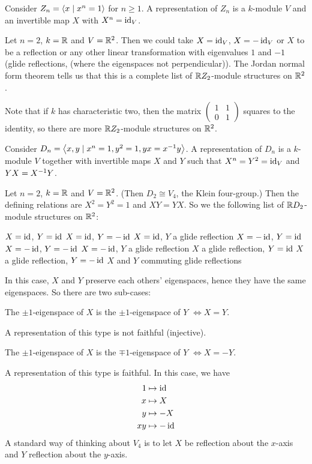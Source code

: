 \begin{exam}
	\leavevmode
	\begin{enum}
		\io
		Consider $Z_n = {\left\langle x \mid x^n=1 \right\rangle}$ for $n \geq 1$.
		A representation of $Z_n$ is a $k$-module $V$ and an invertible map $X$ with $X^n=\operatorname{id}_V$.
		
		Let $n=2$, $k=\mathbb{R}$ and $V=\mathbb{R}^2$.
		Then we could take $X=\operatorname{id}_V$, $X=-\operatorname{id}_V$ or $X$ to be a reflection or any other linear transformation with eigenvalues $1$ and $-1$ (glide reflections, (where the eigenspaces not perpendicular)).
		The Jordan normal form theorem tells us that this is a complete list of $\mathbb{R} Z_2$-module structures on $\mathbb{R}^2$.
		
		Note that if $k$ has characteristic two, then the matrix
		$\left(\begin{smallmatrix}
		1 & 1 \\ 0 & 1
		\end{smallmatrix}\right)$
		squares to the identity, so there are more $\mathbb{R} Z_2$-module structures on $\mathbb{R}^2$.
		
		\io
		Consider $D_n = {\left\langle x,y \mid x^n=1,y^2=1,yx=x^{-1} y \right\rangle}$.
		A representation of $D_n$ is a $k$-module $V$ together with invertible maps $X$ and $Y$ such that $X^n=Y^2=\operatorname{id}_V$ and $YX=X^{-1} Y$.
		
		Let $n=2$, $k=\mathbb{R}$ and $V=\mathbb{R}^2$.
		(Then $D_2 \cong V_4$, the Klein four-group.)
		Then the defining relations are $X^2=Y^2=1$ and $XY=YX$.
		So we the following list of $\mathbb{R} D_2$-module structures on $\mathbb{R}^2$:
		\begin{enum}
			\io $X=\operatorname{id}$, $Y=\operatorname{id}$
			\io $X=\operatorname{id}$, $Y=-\operatorname{id}$
			\io $X=\operatorname{id}$, $Y$ a glide reflection
			\io $X=-\operatorname{id}$, $Y=\operatorname{id}$
			\io $X=-\operatorname{id}$, $Y=-\operatorname{id}$
			\io\label{item:casef} $X=-\operatorname{id}$, $Y$ a glide reflection
			\io $X$ a glide reflection, $Y=\operatorname{id}$
			\io $X$ a glide reflection, $Y=-\operatorname{id}$
			\io $X$ and $Y$ commuting glide reflections
			\par
			In this case, $X$ and $Y$ preserve each others' eigenspaces, hence they have the same eigenspaces.
			So there are two sub-cases:
			\begin{enum}
				\io\label{item:case2i'}
				The $\pm1$-eigenspace of $X$ is the $\pm1$-eigenspace of $Y$ $\iff X=Y$.
				\par
				A representation of this type is not faithful (injective).
				
				\io\label{item:case2i''}
				The $\pm1$-eigenspace of $X$ is the $\mp1$-eigenspace of $Y$ $\iff X=-Y$.
				\par
				A representation of this type is faithful.
				In this case, we have
				\begin{align*}
					1 &\mapsto \operatorname{id} \\
					x &\mapsto X \\
					y &\mapsto -X \\
					xy &\mapsto -\operatorname{id}
				\end{align*}
				A standard way of thinking about $V_4$ is to let $X$ be reflection about the $x$-axis and $Y$ reflection about the $y$-axis.
				

\end{enum}
\end{enum}
\end{enum}
\end{exam}
